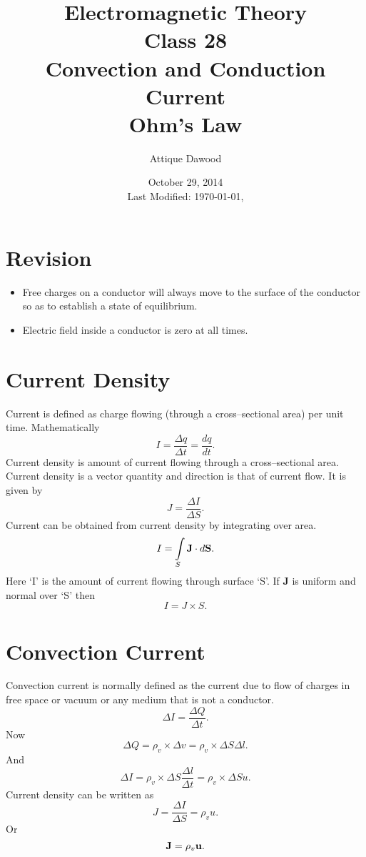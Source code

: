 \documentclass[12pt,a4paper]{article}
\title{Electromagnetic Theory\\Class 28\\Convection and Conduction Current\\Ohm's Law}
\author{Attique Dawood}
\date{October 29, 2014\\[0.2cm] Last Modified: \today, \currenttime}
\begin{document}
\maketitle
\section{Revision}
\begin{itemize}
\item Free charges on a conductor will always move to the surface of the conductor so as to establish a state of equilibrium.
\item Electric field inside a conductor is zero at all times.
\end{itemize}
\section{Current Density}
Current is defined as charge flowing (through a cross--sectional area) per unit time. Mathematically
\begin{equation}
I=\dfrac{\Delta q}{\Delta t}=\dfrac{dq}{dt}.
\end{equation}
Current density is amount of current flowing through a cross--sectional area. Current density is a vector quantity and direction is that of current flow. It is given by
\begin{equation}
J=\dfrac{\Delta I}{\Delta S}.
\end{equation}
Current can be obtained from current density by integrating over area.
\begin{equation}
I=\int\limits_S\mathrm{\textbf J}\cdot d\mathrm{\textbf S}.
\end{equation}
Here `I' is the amount of current flowing through surface `S'. If \textbf{J} is uniform and normal over `S' then
\begin{equation}
I=J\times S.
\end{equation}
\section{Convection Current}
Convection current is normally defined as the current due to flow of charges in free space or vacuum or any medium that is not a conductor.
\begin{equation}
\Delta I=\dfrac{\Delta Q}{\Delta t}.
\end{equation}
Now
\begin{equation}
\Delta Q=\rho_v\times\Delta v=\rho_v\times\Delta S\Delta l.
\end{equation}
And
\begin{equation}
\Delta I=\rho_v\times\Delta S\dfrac{\Delta l}{\Delta t}=\rho_v\times\Delta S u.
\end{equation}
Current density can be written as
\begin{equation}
J=\dfrac{\Delta I}{\Delta S}=\rho_v u.
\end{equation}
Or
\begin{equation}
\mathrm{\textbf J}=\rho_v\mathrm{\textbf u}.
\end{equation}
\end{document}
